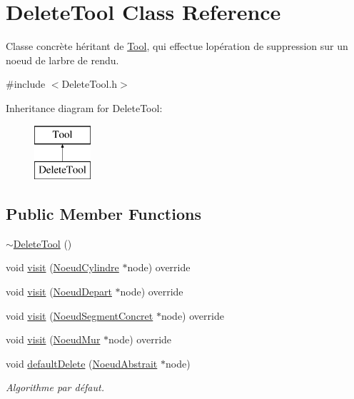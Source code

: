 \hypertarget{class_delete_tool}{}\section{Delete\+Tool Class Reference}
\label{class_delete_tool}


Classe concrète héritant de \hyperlink{class_tool}{Tool}, qui effectue l\textquotesingle{}opération de suppression sur un noeud de l\textquotesingle{}arbre de rendu.  




{\ttfamily \#include $<$Delete\+Tool.\+h$>$}

Inheritance diagram for Delete\+Tool\+:\begin{figure}[H]
\begin{center}
\leavevmode
\includegraphics[height=2.000000cm]{class_delete_tool}
\end{center}
\end{figure}
\subsection*{Public Member Functions}
\begin{DoxyCompactItemize}
\item 
\hyperlink{group__inf2990_ga4a54f710ae3ca5e4eb8e16610d07c3bc}{$\sim$\+Delete\+Tool} ()
\item 
void \hyperlink{group__inf2990_gaf91f134881ce52596486855f405e8f96}{visit} (\hyperlink{class_noeud_cylindre}{Noeud\+Cylindre} $\ast$node) override
\item 
void \hyperlink{group__inf2990_ga9efc126da05a809724a3a2597ac4cb57}{visit} (\hyperlink{class_noeud_depart}{Noeud\+Depart} $\ast$node) override
\item 
void \hyperlink{group__inf2990_ga1908b4ee57bb2dfbf4022412b48470d8}{visit} (\hyperlink{class_noeud_segment_concret}{Noeud\+Segment\+Concret} $\ast$node) override
\item 
void \hyperlink{group__inf2990_ga816147276bc393b0552e031441541726}{visit} (\hyperlink{class_noeud_mur}{Noeud\+Mur} $\ast$node) override
\item 
void \hyperlink{group__inf2990_gab16541bc54ef7e060c56d59d64798805}{default\+Delete} (\hyperlink{class_noeud_abstrait}{Noeud\+Abstrait} $\ast$node)
\begin{DoxyCompactList}\small\item\em Algorithme par défaut. \end{DoxyCompactList}\end{DoxyCompactItemize}


